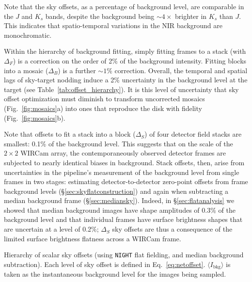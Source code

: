 \documentclass[iop,tighten]{emulateapj}
\newcommand{\Fig}[1]{Fig.~\ref{fig:#1}}  %
\newcommand{\Eq}[1]{Eq.~\ref{eq:#1}}  %
\newcommand{\Tab}[1]{Table~\ref{tab:#1}}  %
\newcommand{\Sec}[1]{\S\ref{sec:#1}}  %
\begin{document}

Note that the sky offsets, as a percentage of background level, are comparable in the $J$ and $K_s$ bands, despite the background being $\sim 4\times$ brighter in $K_s$ than $J$.
This indicates that spatio-temporal variations in the NIR background are monochromatic.

Within the hierarchy of background fitting, simply fitting frames to a stack (with $\Delta_F$) is a correction on the order of 2\% of the background intensity.
Fitting blocks into a mosaic ($\Delta_B$) is a further $\sim 1$\% correction.
Overall, the temporal and spatial lags of sky-target nodding induce a 2\% uncertainty in the background level at the target (see \Tab{offset_hierarchy}).
It is this level of uncertainty that sky offset optimization must diminish to transform uncorrected mosaics (\Fig{mosaics}a) into ones that reproduce the disk with fidelity (\Fig{mosaics}b).

Note that offsets to fit a stack into a block ($\Delta_S$) of four detector field stacks are smallest: 0.1\% of the background level.
This suggests that on the scale of the $2\times 2$ WIRCam array, the contemporaneously observed detector frames are subjected to nearly identical biases in background.
Stack offsets, then, arise from uncertainties in the pipeline's measurement of the background level from single frames in two stages: estimating detector-to-detector zero-point offsets from frame background levels (\Sec{skyflatconstruction}) and again when subtracting a median background frame (\Sec{mediansky}).
Indeed, in \Sec{flatanalysis} we showed that median background images have shape amplitudes of 0.3\% of the background level and that individual frames have surface brightness shapes that are uncertain at a level of 0.2\%; $\Delta_S$ sky offsets are thus a consequence of the limited surface brightness flatness across a WIRCam frame.

\begin{table}[t]
\centering
\caption[Hierarchy of scalar sky offsets]{Hierarchy of scalar sky offsets (using \texttt{NIGHT} flat fielding, and median background subtraction).
  Each level of sky offset is defined in \Eq{netoffset}.
$\langle I_\mathrm{bkg}\rangle$ is taken as the instantaneous background level for the images being sampled.}
\label{tab:offset_hierarchy}

\end{table}
\end{document}
